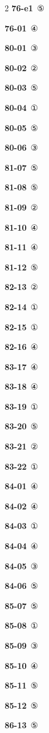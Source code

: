 \documentclass[10pt,a4paper]{article}
\begin{document}
\begin{multicols}{2}
\noindent\textbf{76-e1}\ ⑤\par
\noindent\textbf{76-01}\ ④\par
\noindent\textbf{80-01}\ ③\par
\noindent\textbf{80-02}\ ②\par
\noindent\textbf{80-03}\ ⑤\par
\noindent\textbf{80-04}\ ①\par
\noindent\textbf{80-05}\ ⑤\par
\noindent\textbf{80-06}\ ③\par
\noindent\textbf{81-07}\ ⑤\par
\noindent\textbf{81-08}\ ⑤\par
\noindent\textbf{81-09}\ ②\par
\noindent\textbf{81-10}\ ④\par
\noindent\textbf{81-11}\ ④\par
\noindent\textbf{81-12}\ ⑤\par
\noindent\textbf{82-13}\ ②\par
\noindent\textbf{82-14}\ ①\par
\noindent\textbf{82-15}\ ①\par
\noindent\textbf{82-16}\ ④\par
\noindent\textbf{83-17}\ ④\par
\noindent\textbf{83-18}\ ④\par
\noindent\textbf{83-19}\ ①\par
\noindent\textbf{83-20}\ ⑤\par
\noindent\textbf{83-21}\ ②\par
\noindent\textbf{83-22}\ ①\par
\noindent\textbf{84-01}\ ④\par
\noindent\textbf{84-02}\ ④\par
\noindent\textbf{84-03}\ ①\par
\noindent\textbf{84-04}\ ④\par
\noindent\textbf{84-05}\ ③\par
\noindent\textbf{84-06}\ ⑤\par
\noindent\textbf{85-07}\ ⑤\par
\noindent\textbf{85-08}\ ①\par
\noindent\textbf{85-09}\ ③\par
\noindent\textbf{85-10}\ ④\par
\noindent\textbf{85-11}\ ⑤\par
\noindent\textbf{85-12}\ ⑤\par
\noindent\textbf{86-13}\ ⑤\par

\end{multicols}
\end{document}
